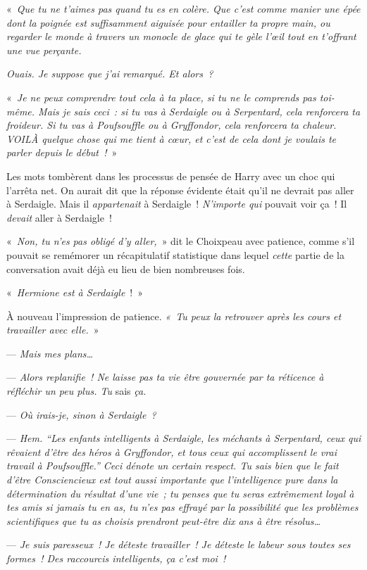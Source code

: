 «~\emph{Que tu ne t'aimes pas quand tu es en colère.
Que c'est comme manier une épée dont la poignée est suffisamment aiguisée pour entailler ta propre main, ou regarder le monde à travers un monocle de glace qui te gèle l'œil tout en t'offrant une vue perçante.}

\emph{Ouais. Je suppose que j'ai remarqué. Et alors~?}

«~\emph{Je ne peux comprendre tout cela à ta place, si tu ne le comprends pas toi-même.
Mais je sais ceci~: si tu vas à Serdaigle ou à Serpentard, cela renforcera ta froideur.
Si tu vas à Poufsouffle ou à Gryffondor, cela renforcera ta chaleur.
VOILÀ quelque chose qui me tient à cœur, et c'est de cela dont je voulais te parler depuis le début~!}~»

Les mots tombèrent dans les processus de pensée de Harry avec un choc qui l'arrêta net. On aurait dit que la réponse évidente était qu'il ne devrait pas aller à Serdaigle. Mais il \emph{appartenait} à Serdaigle~! \emph{N'importe qui} pouvait voir ça~! Il \emph{devait} aller à Serdaigle~!

«~\emph{Non, tu n'es pas obligé d'y aller,}~» dit le Choixpeau avec patience, comme s'il pouvait se remémorer un récapitulatif statistique dans lequel \emph{cette} partie de la conversation avait déjà eu lieu de bien nombreuses fois.

«~\emph{Hermione est à Serdaigle}~!~»

À nouveau l'impression de patience. \emph{«~Tu peux la retrouver après les cours et travailler avec elle.}~»

--- \emph{Mais mes plans…}

--- \emph{Alors replanifie~! Ne laisse pas ta vie être gouvernée par ta réticence à réfléchir un peu plus. Tu} sais \emph{ça.}

--- \emph{Où irais-je, sinon à Serdaigle~?}

--- \emph{Hem. “Les enfants intelligents à Serdaigle, les méchants à Serpentard, ceux qui rêvaient d'être des héros à Gryffondor, et tous ceux qui accomplissent le vrai travail à Poufsouffle.” Ceci dénote un certain respect. Tu sais bien que le fait d'être Consciencieux est tout aussi importante que l'intelligence pure dans la détermination du résultat d'une vie~; tu penses que tu seras extrêmement loyal à tes amis si jamais tu en as, tu n'es pas effrayé par la possibilité que les problèmes scientifiques que tu as choisis prendront peut-être dix ans à être résolus…}

--- \emph{Je suis paresseux~! Je déteste travailler~! Je déteste le labeur sous toutes ses formes~! Des raccourcis intelligents, ça c'est moi~!}

